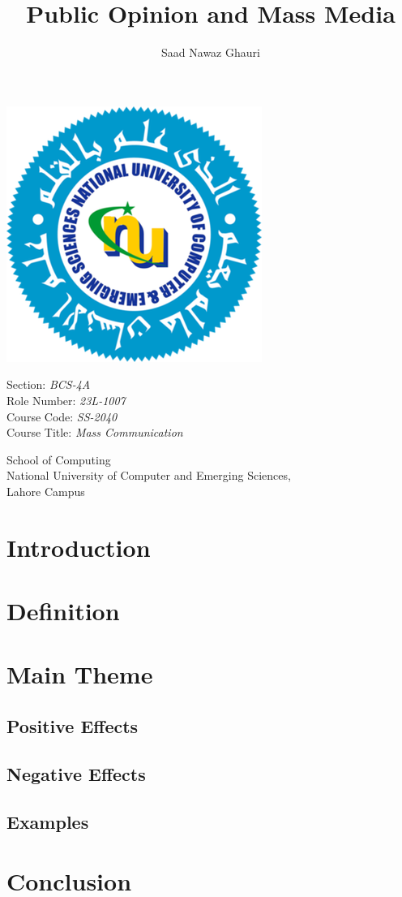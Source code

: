 \documentclass[a4paper,11pt]{article}
\author{Saad Nawaz Ghauri}
\title{Public Opinion and Mass Media}
\begin{document}
\maketitle

\begin{Center}
\includegraphics{nuces_logo.png}
\end{Center}

\begin{Center}
    Section: \emph{BCS-4A} \\
    Role Number: \emph{23L-1007} \\
    Course Code: \emph{SS-2040} \\
    Course Title: \emph{Mass Communication} \\
\end{Center}

\begin{Center}
    School of Computing \\
    National University of Computer and Emerging Sciences, \\
    Lahore Campus \\
\end{Center}

\newpage

\tableofcontents


\section{Introduction}

\section{Definition}

\section{Main Theme}
\subsection{Positive Effects}
\subsection{Negative Effects}
\subsection{Examples}

\section{Conclusion}
\end{document}
